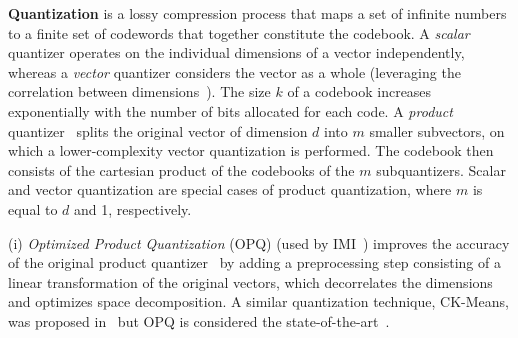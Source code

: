\noindent\textbf{Quantization} 
is a lossy compression process that maps a set of infinite numbers to a finite set of codewords that together constitute the codebook. 
A \emph{scalar} quantizer operates on the individual dimensions of a vector independently, whereas a \emph{vector} quantizer considers the vector as a whole (leveraging the correlation between dimensions~\cite{journal/tit/gray1998}). 
The size $k$ of a codebook increases exponentially with the number of bits allocated for each code. 
A \emph{product} quantizer~\cite{journal/tpami/jegou2011} 
splits
the original vector of dimension $d$ into $m$ smaller subvectors, on which a lower-complexity vector quantization is performed. 
The codebook then consists of the cartesian product of the codebooks of the $m$ subquantizers. 
Scalar and vector quantization are special cases of product quantization, where $m$ is equal to $d$ and 1, respectively.

\noindent(i) 
{\it Optimized Product Quantization} (OPQ) (used by IMI~\cite{journal/tpami/ge2014}) improves the accuracy of the original product quantizer~\cite{journal/tpami/jegou2011} by adding a preprocessing step consisting of a linear transformation of the original vectors, which decorrelates the dimensions and optimizes space decomposition. {\color{black} A similar quantization technique, CK-Means, was proposed in~\cite{ck-means} but OPQ is considered the state-of-the-art~\cite{conf/CVPR/kalantidis2014,journal/ite/matsui2018}}. 

